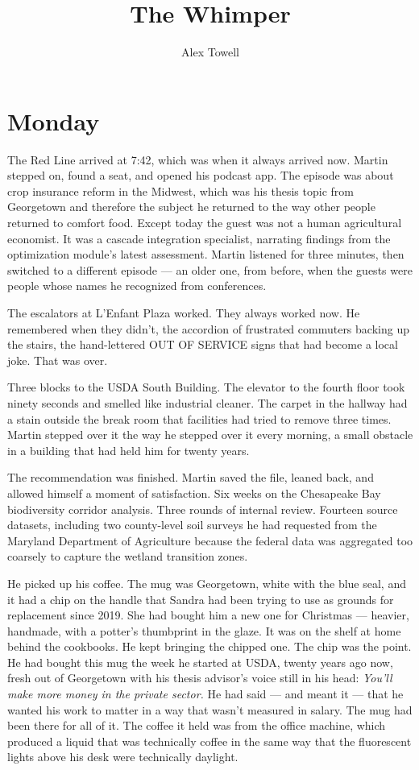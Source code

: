 \documentclass[11pt]{article}
\title{\textbf{The Whimper}}
\author{Alex Towell}
\date{}
\begin{document}
\maketitle
\thispagestyle{empty}

\section*{Monday}

The Red Line arrived at 7:42, which was when it always arrived now. Martin stepped on, found a seat, and opened his podcast app. The episode was about crop insurance reform in the Midwest, which was his thesis topic from Georgetown and therefore the subject he returned to the way other people returned to comfort food. Except today the guest was not a human agricultural economist. It was a cascade integration specialist, narrating findings from the optimization module's latest assessment. Martin listened for three minutes, then switched to a different episode --- an older one, from before, when the guests were people whose names he recognized from conferences.

The escalators at L'Enfant Plaza worked. They always worked now. He remembered when they didn't, the accordion of frustrated commuters backing up the stairs, the hand-lettered OUT OF SERVICE signs that had become a local joke. That was over.

Three blocks to the USDA South Building. The elevator to the fourth floor took ninety seconds and smelled like industrial cleaner. The carpet in the hallway had a stain outside the break room that facilities had tried to remove three times. Martin stepped over it the way he stepped over it every morning, a small obstacle in a building that had held him for twenty years.

The recommendation was finished. Martin saved the file, leaned back, and allowed himself a moment of satisfaction. Six weeks on the Chesapeake Bay biodiversity corridor analysis. Three rounds of internal review. Fourteen source datasets, including two county-level soil surveys he had requested from the Maryland Department of Agriculture because the federal data was aggregated too coarsely to capture the wetland transition zones.

He picked up his coffee. The mug was Georgetown, white with the blue seal, and it had a chip on the handle that Sandra had been trying to use as grounds for replacement since 2019. She had bought him a new one for Christmas --- heavier, handmade, with a potter's thumbprint in the glaze. It was on the shelf at home behind the cookbooks. He kept bringing the chipped one. The chip was the point. He had bought this mug the week he started at USDA, twenty years ago now, fresh out of Georgetown with his thesis advisor's voice still in his head: \emph{You'll make more money in the private sector.} He had said --- and meant it --- that he wanted his work to matter in a way that wasn't measured in salary. The mug had been there for all of it. The coffee it held was from the office machine, which produced a liquid that was technically coffee in the same way that the fluorescent lights above his desk were technically daylight.
\end{document}
